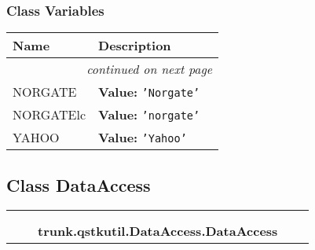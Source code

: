 
  \subsubsection{Class Variables}

    \vspace{-1cm}
\hspace{\varindent}\begin{longtable}{|p{\varnamewidth}|p{\vardescrwidth}|l}
\cline{1-2}
\cline{1-2} \centering \textbf{Name} & \centering \textbf{Description}& \\
\cline{1-2}
\endhead\cline{1-2}\multicolumn{3}{r}{\small\textit{continued on next page}}\\\endfoot\cline{1-2}
\endlastfoot\raggedright N\-O\-R\-G\-A\-T\-E\- & \raggedright \textbf{Value:} 
{\tt \texttt{'}\texttt{Norgate}\texttt{'}}&\\
\cline{1-2}
\raggedright N\-O\-R\-G\-A\-T\-E\-l\-c\- & \raggedright \textbf{Value:} 
{\tt \texttt{'}\texttt{norgate}\texttt{'}}&\\
\cline{1-2}
\raggedright Y\-A\-H\-O\-O\- & \raggedright \textbf{Value:} 
{\tt \texttt{'}\texttt{Yahoo}\texttt{'}}&\\
\cline{1-2}
\end{longtable}



\subsection{Class DataAccess}

    \label{trunk:qstkutil:DataAccess:DataAccess}
\begin{tabular}{cccccc}
\multicolumn{2}{r}{\settowidth{\BCL}{object}\multirow{2}{\BCL}{object}}
&&
  \\\cline{3-3}
  &&\multicolumn{1}{c|}{}
&&
  \\
&&\multicolumn{2}{l}{\textbf{trunk.qstkutil.DataAccess.DataAccess}}
\end{tabular}

